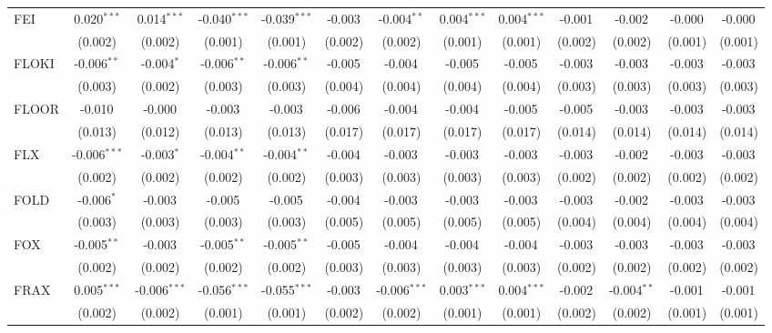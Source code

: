 \begin{table}[!htbp]
\begin{tabular}{@{\extracolsep{5pt}}lcccccccccccc}
 FEI & 0.020$^{***}$ & 0.014$^{***}$ & -0.040$^{***}$ & -0.039$^{***}$ & -0.003$^{}$ & -0.004$^{**}$ & 0.004$^{***}$ & 0.004$^{***}$ & -0.001$^{}$ & -0.002$^{}$ & -0.000$^{}$ & -0.000$^{}$ \\
  & (0.002) & (0.002) & (0.001) & (0.001) & (0.002) & (0.002) & (0.001) & (0.001) & (0.002) & (0.002) & (0.001) & (0.001) \\
 FLOKI & -0.006$^{**}$ & -0.004$^{*}$ & -0.006$^{**}$ & -0.006$^{**}$ & -0.005$^{}$ & -0.004$^{}$ & -0.005$^{}$ & -0.005$^{}$ & -0.003$^{}$ & -0.003$^{}$ & -0.003$^{}$ & -0.003$^{}$ \\
  & (0.003) & (0.002) & (0.003) & (0.003) & (0.004) & (0.004) & (0.004) & (0.004) & (0.003) & (0.003) & (0.003) & (0.003) \\
 FLOOR & -0.010$^{}$ & -0.000$^{}$ & -0.003$^{}$ & -0.003$^{}$ & -0.006$^{}$ & -0.004$^{}$ & -0.004$^{}$ & -0.005$^{}$ & -0.005$^{}$ & -0.003$^{}$ & -0.003$^{}$ & -0.003$^{}$ \\
  & (0.013) & (0.012) & (0.013) & (0.013) & (0.017) & (0.017) & (0.017) & (0.017) & (0.014) & (0.014) & (0.014) & (0.014) \\
 FLX & -0.006$^{***}$ & -0.003$^{*}$ & -0.004$^{**}$ & -0.004$^{**}$ & -0.004$^{}$ & -0.003$^{}$ & -0.003$^{}$ & -0.003$^{}$ & -0.003$^{}$ & -0.002$^{}$ & -0.003$^{}$ & -0.003$^{}$ \\
  & (0.002) & (0.002) & (0.002) & (0.002) & (0.003) & (0.003) & (0.003) & (0.003) & (0.002) & (0.002) & (0.002) & (0.002) \\
 FOLD & -0.006$^{*}$ & -0.003$^{}$ & -0.005$^{}$ & -0.005$^{}$ & -0.004$^{}$ & -0.003$^{}$ & -0.003$^{}$ & -0.003$^{}$ & -0.003$^{}$ & -0.002$^{}$ & -0.003$^{}$ & -0.003$^{}$ \\
  & (0.003) & (0.003) & (0.003) & (0.003) & (0.005) & (0.005) & (0.005) & (0.005) & (0.004) & (0.004) & (0.004) & (0.004) \\
 FOX & -0.005$^{**}$ & -0.003$^{}$ & -0.005$^{**}$ & -0.005$^{**}$ & -0.005$^{}$ & -0.004$^{}$ & -0.004$^{}$ & -0.004$^{}$ & -0.003$^{}$ & -0.003$^{}$ & -0.003$^{}$ & -0.003$^{}$ \\
  & (0.002) & (0.002) & (0.002) & (0.002) & (0.003) & (0.003) & (0.003) & (0.003) & (0.002) & (0.002) & (0.002) & (0.002) \\
 FRAX & 0.005$^{***}$ & -0.006$^{***}$ & -0.056$^{***}$ & -0.055$^{***}$ & -0.003$^{}$ & -0.006$^{***}$ & 0.003$^{***}$ & 0.004$^{***}$ & -0.002$^{}$ & -0.004$^{**}$ & -0.001$^{}$ & -0.001$^{}$ \\
  & (0.002) & (0.002) & (0.001) & (0.001) & (0.002) & (0.002) & (0.001) & (0.001) & (0.002) & (0.002) & (0.001) & (0.001) \\

\end{tabular}
\end{table}
